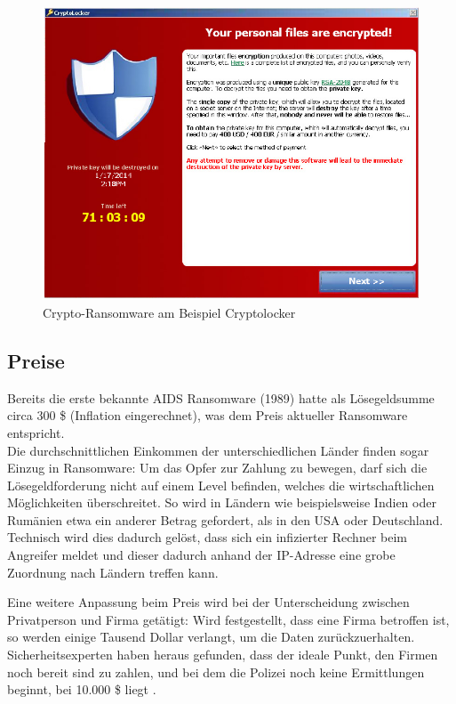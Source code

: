 \begin{figure}[h!]
	\centering
	\includegraphics[width=\textwidth]{img/cryptolocker.png}
	\caption{Crypto-Ransomware am Beispiel \glqq Cryptolocker\grqq \cite{evolution}}
	\label{fig:cryptolocker}
\end{figure}


\subsection{Preise} %

Bereits die erste bekannte AIDS Ransomware (1989) hatte als Lösegeldsumme circa 300 \$ (Inflation eingerechnet), was dem Preis aktueller Ransomware entspricht. \cite{evolution}\\ 
Die durchschnittlichen Einkommen der unterschiedlichen Länder finden sogar Einzug in Ransomware: Um das Opfer zur Zahlung zu bewegen, darf sich die Lösegeldforderung nicht auf einem Level befinden, welches die wirtschaftlichen Möglichkeiten überschreitet. So wird in Ländern wie beispielsweise Indien oder Rumänien etwa ein anderer Betrag gefordert, als in den USA oder Deutschland. Technisch wird dies dadurch gelöst, dass sich ein infizierter Rechner beim Angreifer meldet und dieser dadurch anhand der IP-Adresse eine grobe Zuordnung nach Ländern treffen kann.

Eine weitere Anpassung beim Preis wird bei der Unterscheidung zwischen Privatperson und Firma getätigt: Wird festgestellt, dass eine Firma betroffen ist, so werden einige Tausend Dollar verlangt, um die Daten zurückzuerhalten. Sicherheitsexperten haben heraus gefunden, dass der ideale Punkt, den Firmen noch bereit sind zu zahlen, und bei dem die Polizei noch keine Ermittlungen beginnt, bei 10.000 \$ liegt \cite{sweetspot}.

